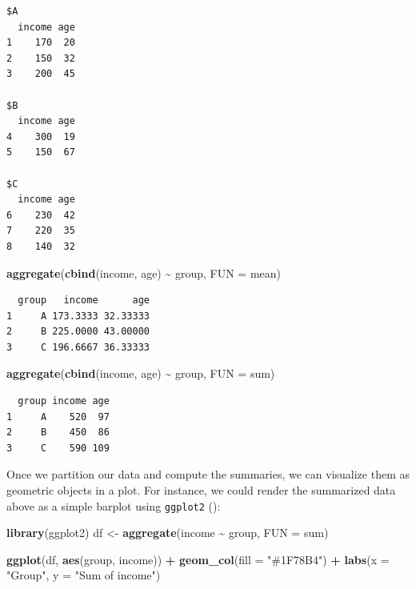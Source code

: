 \documentclass[
  openany]{book}
\newenvironment{Shaded}{\begin{snugshade}}{\end{snugshade}}
\newcommand{\AttributeTok}[1]{\textcolor[rgb]{0.13,0.29,0.53}{#1}}
\newcommand{\FunctionTok}[1]{\textcolor[rgb]{0.13,0.29,0.53}{\textbf{#1}}}
\newcommand{\NormalTok}[1]{#1}
\newcommand{\OtherTok}[1]{\textcolor[rgb]{0.56,0.35,0.01}{#1}}
\newcommand{\SpecialCharTok}[1]{\textcolor[rgb]{0.81,0.36,0.00}{\textbf{#1}}}
\newcommand{\StringTok}[1]{\textcolor[rgb]{0.31,0.60,0.02}{#1}}
\theoremstyle{definition}
\theoremstyle{definition}
\theoremstyle{definition}
\theoremstyle{definition}
\theoremstyle{remark}
\begin{document}
\begin{verbatim}
$A
  income age
1    170  20
2    150  32
3    200  45

$B
  income age
4    300  19
5    150  67

$C
  income age
6    230  42
7    220  35
8    140  32
\end{verbatim}

\begin{Shaded}
\begin{Highlighting}[]
\FunctionTok{aggregate}\NormalTok{(}\FunctionTok{cbind}\NormalTok{(income, age) }\SpecialCharTok{\textasciitilde{}}\NormalTok{ group, }\AttributeTok{FUN =}\NormalTok{ mean)}
\end{Highlighting}
\end{Shaded}

\begin{verbatim}
  group   income      age
1     A 173.3333 32.33333
2     B 225.0000 43.00000
3     C 196.6667 36.33333
\end{verbatim}

\begin{Shaded}
\begin{Highlighting}[]
\FunctionTok{aggregate}\NormalTok{(}\FunctionTok{cbind}\NormalTok{(income, age) }\SpecialCharTok{\textasciitilde{}}\NormalTok{ group, }\AttributeTok{FUN =}\NormalTok{ sum)}
\end{Highlighting}
\end{Shaded}

\begin{verbatim}
  group income age
1     A    520  97
2     B    450  86
3     C    590 109
\end{verbatim}

Once we partition our data and compute the summaries, we can visualize them as geometric objects in a plot. For instance, we could render the summarized data above as a simple barplot using \texttt{ggplot2} ():

\begin{Shaded}
\begin{Highlighting}[]
\FunctionTok{library}\NormalTok{(ggplot2)}
\NormalTok{df }\OtherTok{\textless{}{-}} \FunctionTok{aggregate}\NormalTok{(income }\SpecialCharTok{\textasciitilde{}}\NormalTok{ group, }\AttributeTok{FUN =}\NormalTok{ sum)}

\FunctionTok{ggplot}\NormalTok{(df, }\FunctionTok{aes}\NormalTok{(group, income)) }\SpecialCharTok{+}
  \FunctionTok{geom\_col}\NormalTok{(}\AttributeTok{fill =} \StringTok{"\#1F78B4"}\NormalTok{) }\SpecialCharTok{+}
  \FunctionTok{labs}\NormalTok{(}\AttributeTok{x =} \StringTok{"Group"}\NormalTok{, }\AttributeTok{y =} \StringTok{"Sum of income"}\NormalTok{)}
\end{Highlighting}
\end{Shaded}
\end{document}
